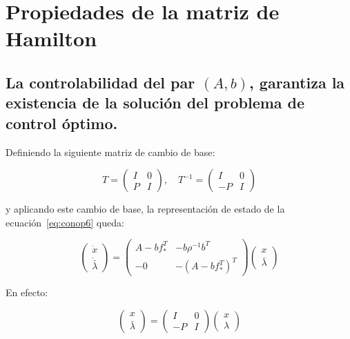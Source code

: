     \section{Propiedades de la matriz de Hamilton}

        \subsection{La controlabilidad del par $(A, b)$, garantiza la existencia de la solución del problema de control óptimo.}

        Definiendo la siguiente matriz de cambio de base:

        \begin{equation}
            T =
            \begin{pmatrix}
                I & 0 \\
                P & I
            \end{pmatrix}, \quad T^{-1} =
            \begin{pmatrix}
                I & 0 \\
                -P & I
            \end{pmatrix}
        \end{equation}

        y aplicando este cambio de base, la representación de estado de la ecuación~\ref{eq:conop6} queda:

        \begin{equation} \label{eq:conop10}
            \begin{pmatrix}
                \dot{x} \\
                \dot{\bar{\lambda}}
            \end{pmatrix} =
            \begin{pmatrix}
                A - b f_*^T & -b \rho^{-1} b^T \\
                -0 & - (A - b f_*^T)^T
            \end{pmatrix}
            \begin{pmatrix}
                x \\
                \bar{\lambda}
            \end{pmatrix}
        \end{equation}

        En efecto:

        \begin{equation*}
            \begin{pmatrix}
                x \\
                \bar{\lambda}
            \end{pmatrix} =
            \begin{pmatrix}
                I & 0 \\
                -P & I
            \end{pmatrix}
            \begin{pmatrix}
                x \\
                \lambda
            \end{pmatrix}
        \end{equation*}

